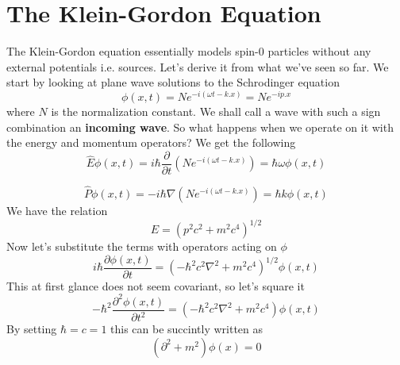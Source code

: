\section{The Klein-Gordon Equation}
The Klein-Gordon equation essentially models spin-0 particles without any external potentials i.e. sources.
Let's derive it from what we've seen so far. We start by looking at plane wave solutions to the Schrodinger equation
\begin{equation}
    \phi(x,t) = Ne^{-i(\omega t -k.x)} = Ne^{-ip.x} 
\end{equation}
where $N$ is the normalization constant. We shall call a wave with such a sign combination an \textbf{incoming wave}. So what happens when we operate on it with the energy and momentum operators? We get the following
\begin{equation} \label{energop}
\hat{E}\phi(x,t) = i \hbar \frac{\partial}{\partial t}(Ne^{-i(\omega t -k.x)}) = \hbar \omega \phi(x,t)
\end{equation}

\begin{equation} \label{momenop}
\hat{P}\phi(x,t) = -i \hbar \nabla (Ne^{-i(\omega t -k.x)}) = \hbar k \phi(x,t)
\end{equation}
We have the relation
\begin{equation}
    E = {(p^{2}c^{2} + m^{2}c^{4})}^{1/2}
\end{equation}
Now let's substitute the terms with operators acting on $\phi$
\begin{equation}
    i \hbar \frac{\partial \phi(x,t)}{\partial t} = {(-\hbar^{2}c^{2}\nabla^{2} + m^{2}c^{4})}^{1/2}\phi(x,t)
\end{equation}
This at first glance does not seem covariant, so let's square it
\begin{equation}
    - \hbar^{2} \frac{\partial^{2} \phi(x,t)}{\partial t^{2}} = (-\hbar^{2}c^{2}\nabla^{2} + m^{2}c^{4}) \phi(x,t)
\end{equation}
By setting $\hbar = c = 1$ this can be succintly written as
\begin{equation}
    (\partial^{2} + m^{2}) \phi(x) = 0
\end{equation}
